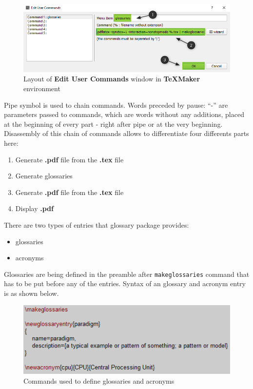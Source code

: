 \begin{figure}[H]
\centering
\includegraphics[scale=0.6]{content/LaTeX/figures/custom_command_marked.png}
\caption{Layout of \textbf{Edit User Commands} window in \textbf{TeXMaker} environment}
\end{figure}

Pipe symbol is used to chain commands. Words preceded by pause: ``-'' are parameters passed to commands, which are words without any additions, placed at the beginning of every part - right after pipe or at the very beginning. Disassembly of this chain of commands allows to differentiate four differents parts here:
\begin{enumerate}
\item Generate \textbf{.pdf} file from the \textbf{.tex} file
\item Generate glossaries
\item Generate \textbf{.pdf} file from the \textbf{.tex} file
\item Display \textbf{.pdf}
\end{enumerate}

There are two types of entries that glossary package provides:
\begin{itemize}
\item glossaries
\item acronyms
\end{itemize}

Glossaries are being defined in the preamble after \texttt{\bs makeglossaries} command that has to be put before any of the entries. Syntax of an glossary and acronym entry is as shown below.

\begin{figure}[H]
\centering
\includegraphics[scale=1.0]{content/LaTeX/figures/glossary_definition.png}
\caption{Commands used to define glossaries and acronyms}
\label{fig:glossary_definition}
\end{figure}

